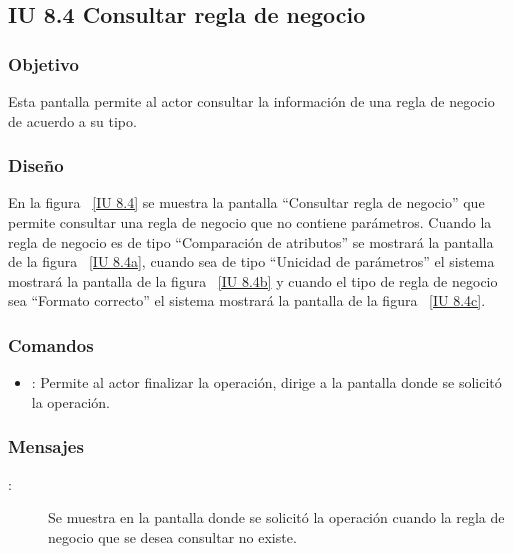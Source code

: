 \subsection{IU 8.4 Consultar regla de negocio}

\subsubsection{Objetivo}
	
	Esta pantalla permite al actor consultar la información de una regla de negocio de acuerdo a su tipo.

\subsubsection{Diseño}

    En la figura ~\ref{IU 8.4} se muestra la pantalla ``Consultar regla de negocio'' que permite consultar una regla de negocio que no contiene parámetros. 
    Cuando la regla de negocio es de tipo ``Comparación de atributos'' se mostrará la pantalla de la figura ~\ref{IU 8.4a}, cuando sea de tipo ``Unicidad de parámetros''
    el sistema mostrará la pantalla de la figura ~\ref{IU 8.4b} y cuando el tipo de regla de negocio sea ``Formato correcto'' el sistema mostrará la pantalla de
    la figura ~\ref{IU 8.4c}.\\



\subsubsection{Comandos}
\begin{itemize}
	\item {}: Permite al actor finalizar la operación, dirige a la pantalla donde se solicitó la operación.
\end{itemize}

\subsubsection{Mensajes}
	
\begin{description}
	\item[:] Se muestra en la pantalla donde se solicitó la operación cuando la regla de negocio que se desea consultar no existe.
\end{description}
